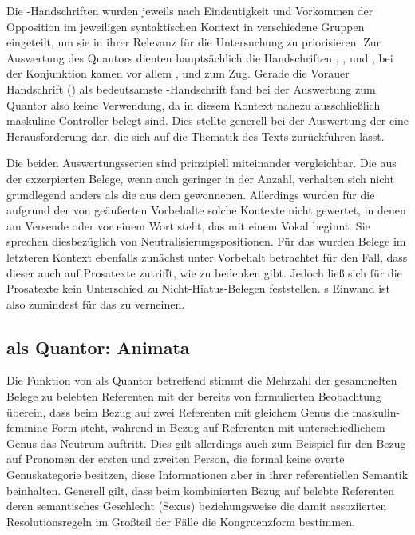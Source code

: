 Die \KC{}-Handschriften wurden jeweils nach Eindeutigkeit und Vorkommen
der Opposition im jeweiligen syntaktischen Kontext in verschiedene Gruppen
eingeteilt, um sie in ihrer Relevanz für die Untersuchung zu priorisieren. Zur
Auswertung des Quantors  dienten hauptsächlich die Handschriften
\citet{kc:B1}, \citet{kc:C1}, \citet{kc:K} und \citet{kc:VB}; bei der
Konjunktion  kamen vor allem \citet{kc:A1}, \citet{kc:B1} und
\citet{kc:VB} zum Zug. Gerade die Vorauer Handschrift (\citet{kc:A1}) als
bedeutsamste \KC{}-Handschrift fand bei der Auswertung zum Quantor
 also keine Verwendung, da in diesem Kontext nahezu
ausschließlich maskuline Controller belegt sind. Dies stellte generell bei der
Auswertung der \KC{} eine Herausforderung dar, die sich auf die Thematik
des Texts zurückführen lässt.

Die beiden Auswertungsserien sind prinzipiell miteinander vergleichbar. Die aus
der \KC{} exzerpierten Belege, wenn auch geringer in der Anzahl, verhalten
sich nicht grundlegend anders als die aus dem \CAO{} gewonnenen.
Allerdings wurden für die \KC{} aufgrund der von
\textcites[89--90]{askedal1973}[191]{gjelsten1980} geäußerten Vorbehalte solche
Kontexte nicht gewertet, in denen  am Versende oder vor einem Wort
steht, das mit einem Vokal beginnt. Sie sprechen diesbezüglich von
Neutralisierungs\-positionen. Für das \CAO{} wurden Belege im
letzteren Kontext ebenfalls zunächst unter Vorbehalt betrachtet für den Fall,
dass dieser auch auf Prosatexte zutrifft, wie \citet[92]{askedal1973} zu
bedenken gibt. Jedoch ließ sich für die Prosatexte kein Unterschied zu
Nicht-\allowbreak{}Hiatus-\allowbreak{}Belegen feststellen.
\citeauthor{askedal1973}s Einwand ist also zumindest für das \CAO{} zu
verneinen.

\subsection{ als Quantor: Animata}

Die Funktion von  als Quantor betreffend stimmt die Mehrzahl
der gesammelten Belege zu belebten Referenten mit der bereits von
\textcites[312]{grimm1890}[39--41]{behaghel1928} formulierten Beobachtung
überein, dass beim Bezug auf zwei Referenten mit gleichem Genus die
maskulin-feminine Form steht, während in Bezug auf Referenten mit
unterschiedlichem Genus das Neutrum auftritt. Dies gilt allerdings auch zum
Beispiel für den Bezug auf Pronomen der ersten und zweiten Person, die formal
keine overte Genuskategorie besitzen, diese Informationen aber in ihrer
referentiellen Semantik beinhalten. Generell gilt, dass beim kombinierten Bezug
auf belebte Referenten deren semantisches Geschlecht (Sexus) beziehungsweise
die damit assoziierten Resolutionsregeln im Großteil der Fälle die
Kongruenzform bestimmen.


